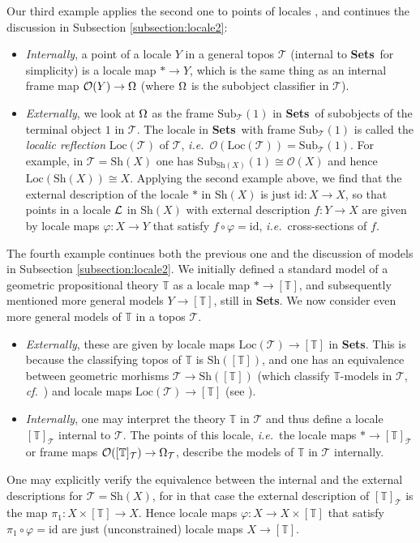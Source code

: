 \documentclass[11pt]{article}
\newcommand{\Sets}{\mbox{\textbf{Sets}}}
\newcommand{\raw}{\rightarrow} \newcommand{\rat}{\mapsto}
\newcommand{\CO}{{\mathcal O}} \newcommand{\CP}{{\mathcal P}}
\newcommand{\CT}{{\mathcal T}} \newcommand{\CV}{{\mathcal V}}
\newcommand{\T}{{\mathbb T}} \newcommand{\Z}{{\mathbb Z}}
\newcommand{\Sh}{\ensuremath{\mathrm{Sh}}}
\newcommand{\ie}{\textit{i.e.}}
\begin{document}
Our third example applies the second one to points of locales
\cite{maclanemoerdijk92}, and continues the discussion
in Subsection \ref{subsection:locale2}:
\begin{itemize}
\item {\it Internally},  a point of a locale $Y$ in a general topos
 $\CT$ (internal to \Sets\ for simplicity) is a  locale map  $*\raw Y$, which is
the same thing as
  an internal  frame map $\CO(Y)\raw\Om$ (where $\Omega$ is the subobject
classifier in $\CT$).
  \item {\it
 Externally}, we look at $\Omega$ as the frame $\mathrm{Sub}_{\CT}(1)$ in \Sets\
 of subobjects of the terminal object $1$ in $\CT$. The locale in \Sets\ with
frame  $\mathrm{Sub}_{\CT}(1)$ is called the {\it localic reflection}
 $\mathrm{Loc}(\CT)$ of $\CT$, \ie\
$\CO(\mathrm{Loc}(\CT))=\mathrm{Sub}_{\CT}(1)$.
 For example, in $\CT=\Sh(X)$ one has $\mathrm{Sub}_{\Sh(X)}(1)\cong\CO(X)$ and
hence
 $\mathrm{Loc}(\Sh(X))\cong X$. Applying the second example above, we find that
 the external description of the locale $*$ in $\Sh(X)$ is just
 $\mathrm{id}:X\raw X$, so that  points in a locale ${\mathcal L}$ in $\Sh(X)$
 with external description $f:Y\raw X$ are given by locale maps
 $\varphi:X\raw Y$ that satisfy $f\circ\varphi=\mathrm{id}$, \ie\
 cross-sections of $f$.
\end{itemize}

The fourth example continues both the previous one and the discussion  of models
in Subsection \ref{subsection:locale2}. We initially defined a standard model
of a geometric propositional theory $\T$ as a locale map $*\raw[\T]$, and
subsequently mentioned more general models
$Y\raw [\T]$, still in \Sets. We now consider even more general models of $\T$
in a topos $\CT$.
\begin{itemize}
\item
{\it Externally}, these are given by  locale maps $\mathrm{Loc}(\CT)\raw [\T]$
in \Sets. This is because the classifying topos of $\T$ is $\Sh([\T])$, and one
has an equivalence
between geometric morhisms $\CT\raw \Sh([\T])$ (which classify $\T$-models in
$\CT$, {\it cf.}\  \cite[Thm.\  X.6.1]{maclanemoerdijk92})
and locale maps $\mathrm{Loc}(\CT)\raw [\T]$ (see
\cite[\S~IX.5]{maclanemoerdijk92}).
\item
{\it Internally}, one may interpret the theory $\T$ in $\CT$ and thus define a
locale
$[\T]_{\CT}$ internal to $\CT$. The points of this locale, \ie\ the locale maps
 $*\raw [\T]_{\CT}$ or frame maps $\CO( [\T]_{\CT})\raw\Om_{\CT}$,
 describe the  models of $\T$ in  $\CT$ internally.
\end{itemize}
 One may explicitly verify the equivalence between the internal and
 the external descriptions for $\CT=\Sh(X)$, for in that case the
 external description of $[\T]_{\CT}$ is the map $\pi_1: X\times
 [\T]\raw X$. Hence locale
 maps  $\varphi:X\raw  X\times [\T]$ that satisfy
 $\pi_1\circ\varphi=\mathrm{id}$ are just (unconstrained) locale
 maps $X\raw  [\T]$.
\end{document}
